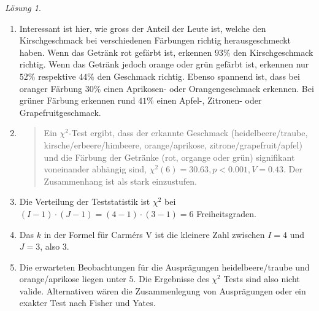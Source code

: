 \documentclass[
]{book}
\theoremstyle{definition}
\theoremstyle{definition}
\theoremstyle{definition}
\theoremstyle{definition}
\theoremstyle{remark}
\newtheorem*{solution}{Lösung}
\begin{document}
\begin{solution}
\begin{enumerate}
\def\labelenumi{\alph{enumi})}
\item
  Interessant ist hier, wie gross der Anteil der Leute ist, welche den Kirschgeschmack bei verschiedenen Färbungen richtig herausgeschmeckt haben. Wenn das Getränk rot gefärbt ist, erkennen \(93\%\) den Kirschgeschmack richtig. Wenn das Getränk jedoch orange oder grün gefärbt ist, erkennen nur \(52\%\) respektive \(44\%\) den Geschmack richtig. Ebenso spannend ist, dass bei oranger Färbung \(30\%\) einen Aprikosen- oder Orangengeschmack erkennen. Bei grüner Färbung erkennen rund \(41\%\) einen Apfel-, Zitronen- oder Grapefruitgeschmack.
\item
  \begin{quote}
  Ein \(\chi^2\)-Test ergibt, dass der erkannte Geschmack (heidelbeere/traube, kirsche/erbeere/himbeere, orange/aprikose, zitrone/grapefruit/apfel) und die Färbung der Getränke (rot, organge oder grün) signifikant voneinander abhängig sind,
  \(\chi^2 (6) = 30.63, p < 0.001, V = 0.43\). Der Zusammenhang ist als stark einzustufen.
  \end{quote}
\item
  Die Verteilung der Teststatistik ist \(\chi^2\) bei \((I-1)\cdot (J-1) = (4-1)\cdot (3-1) = 6\) Freiheitsgraden.
\item
  Das \(k\) in der Formel für Carmérs V ist die kleinere Zahl zwischen \(I = 4\) und \(J = 3\), also \(3\).
\item
  Die erwarteten Beobachtungen für die Ausprägungen heidelbeere/traube und orange/aprikose liegen unter \(5\). Die Ergebnisse des \(\chi^2\) Tests sind also nicht valide. Alternativen wären die Zusammenlegung von Ausprägungen oder ein exakter Test nach Fisher und Yates.
\end{enumerate}

\end{solution}
\end{document}
